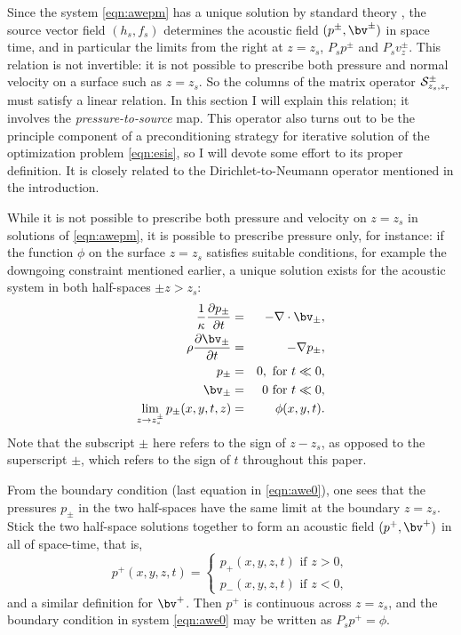 Since the system \ref{eqn:awepm} has a unique solution by standard
theory \cite[]{Lax:PDENotes}, the source vector field $(h_s,f_s)$
determines the acoustic field $(p^{\pm},\bv^{\pm})$ in space time, and
in particular the limits from the right at $z=z_s$, $P_sp^{\pm}$ and
$P_sv_z^{\pm}$. This relation is not invertible: it is not possible to
prescribe both pressure and normal velocity on a surface such as
$z=z_s$. So the columns of the matrix operator
${\cal S}^{\pm}_{z_s,z_r}$ must satisfy a linear relation. In this
section I will explain this relation; it involves the {\em
  pressure-to-source} map. This operator also turns out to be the
principle component of a preconditioning strategy for iterative
solution of the optimization problem \ref{eqn:esis}, so I will devote
some effort to its proper definition. It is closely related to the
Dirichlet-to-Neumann operator mentioned in the introduction.

While it is not possible to prescribe both pressure and velocity on
$z=z_s$ in solutions of \ref{eqn:awepm}, it is possible to
prescribe pressure only, for instance: if the function $\phi$ on
the surface $z=z_s$ satisfies suitable conditions, for
example the downgoing constraint mentioned earlier, a unique solution
exists for the acoustic system in both half-spaces $\pm z > z_s$:
\begin{eqnarray}
\label{eqn:awe0}
  \frac{1}{\kappa}\frac{\partial p_{\pm}}{\partial t} & = & - \nabla \cdot \bv_{\pm}, \nonumber \\
  \rho\frac{\partial \bv_{\pm}}{\partial t} & = & - \nabla
                                                    p_{\pm}, \nonumber \\
  p_{\pm} & =& 0,  \mbox{ for } t \ll 0, \nonumber\\ 
  \bv_{\pm} & = & 0 \mbox{ for } t \ll 0, \nonumber\\
  \lim_{z \rightarrow z_s^{\pm}}p_{\pm}(x,y,t,z)& =& \phi(x,y,t).
\end{eqnarray}
Note that the subscript $\pm$ here refers to the sign of $z-z_s$, as opposed
to the superscript ${\pm}$, which refers to the sign of $t$ throughout
this paper.

From the boundary condition (last equation in \ref{eqn:awe0}), one
sees that the pressures $p_{\pm}$ in the two half-spaces have the same
limit at the boundary $z=z_s$. Stick the two half-space
solutions together to form an acoustic field $(p^+,\bv^+)$ in all of
space-time, that is,
\begin{equation}
  \label{eqn:awealt}
  p^+(x,y,z,t) =
  \left\{
    \begin{array}{c}
      p_+(x,y,z,t) \mbox{ if } z>0,\\
      p_-(x,y,z,t) \mbox{ if } z<0,
    \end{array}
  \right.
\end{equation}
and a similar definition for $\bv^+$. Then $p^+$ is continuous across
$z=z_s$, and the boundary condition in system \ref{eqn:awe0} may be
written as $P_sp^+=\phi$.

